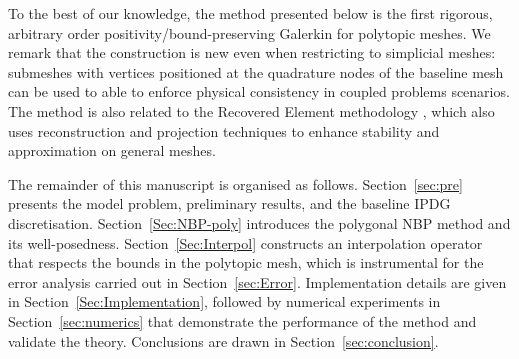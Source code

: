 \documentclass[11pt,final]{amsart}
\theoremstyle{plain}
\theoremstyle{definition}
\newcommand\calP{{\mathcal{P}}}
\newcommand\calT{{\mathcal{T}}}
\newcommand{\mesh}{\calP}
\begin{document}


To the best of our knowledge, the method presented below is the first rigorous, arbitrary order
positivity/bound-preserving Galerkin for polytopic
meshes.  We remark that the construction is new even when restricting to simplicial
meshes: submeshes with vertices positioned at the quadrature nodes of the baseline mesh can be used to able to enforce physical consistency in coupled problems  scenarios. The method is also related to the Recovered
Element methodology \cite{georgoulis2018recovered,dong2020recovered},
which also uses reconstruction and projection techniques to
enhance stability and approximation on general meshes.  


The remainder of this manuscript is organised as
follows. Section~\ref{sec:pre} presents the model problem, preliminary
results, and the baseline IPDG
discretisation. Section~\ref{Sec:NBP-poly} introduces the polygonal
NBP method and its well-posedness. Section~\ref{Sec:Interpol}
constructs an interpolation operator that respects the bounds in the
polytopic mesh, which is instrumental for the error analysis carried
out in Section~\ref{sec:Error}. Implementation details are given in
Section~\ref{Sec:Implementation}, followed by numerical experiments in
Section~\ref{sec:numerics} that demonstrate the performance of the
method and validate the theory. Conclusions are drawn in
Section~\ref{sec:conclusion}.
\end{document}
